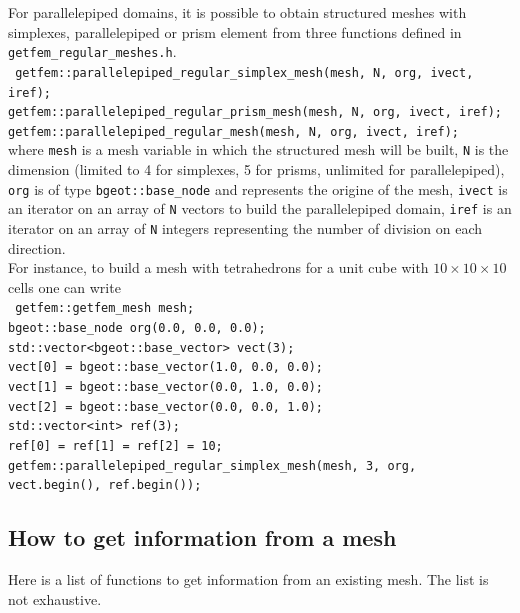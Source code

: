 \documentclass[11pt,a4paper]{article}
\begin{document}
For parallelepiped domains, it is possible to obtain structured meshes with simplexes, parallelepiped or prism element from three functions defined in {\tt getfem\_regular\_meshes.h}. \\[0.5cm]
{\tt
  getfem::parallelepiped\_regular\_simplex\_mesh(mesh, N, org, ivect, iref); \\
  getfem::parallelepiped\_regular\_prism\_mesh(mesh, N, org, ivect, iref); \\
  getfem::parallelepiped\_regular\_mesh(mesh, N, org, ivect, iref);
} \\[0.5cm]
where {\tt mesh} is a mesh variable in which the structured mesh will be built, {\tt N} is the dimension (limited to 4 for simplexes, 5 for prisms, unlimited for parallelepiped), {\tt org} is of type {\tt bgeot::base\_node} and represents the origine of the mesh, {\tt ivect} is an iterator on an array of {\tt N} vectors to build the parallelepiped domain, {\tt iref} is an iterator on an array of {\tt N} integers representing the number of division on each direction. \\[0.5cm]
For instance, to build a mesh with tetrahedrons for a unit cube with $10\times10\times10$ cells one can write\\[0.5cm]
{\tt
  getfem::getfem\_mesh mesh; \\
  bgeot::base\_node org(0.0, 0.0, 0.0); \\
  std::vector<bgeot::base\_vector> vect(3); \\
  vect[0] = bgeot::base\_vector(1.0, 0.0, 0.0); \\
  vect[1] = bgeot::base\_vector(0.0, 1.0, 0.0); \\
  vect[2] = bgeot::base\_vector(0.0, 0.0, 1.0); \\
  std::vector<int> ref(3); \\
  ref[0] = ref[1] = ref[2] = 10; \\
  getfem::parallelepiped\_regular\_simplex\_mesh(mesh, 3, org, vect.begin(), ref.begin()); 
}\\[0.5cm]


\subsection{How to get information from a mesh}

Here is a list of functions to get information from an existing mesh. The list is not exhaustive.
\end{document}
